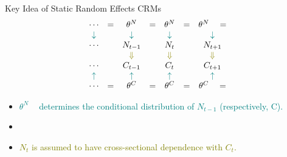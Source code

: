 \documentclass[ignorenonframetext,]{beamer}
\begin{document}
\begin{frame}{Key Idea of Static Random Effects CRMs}
$$
\begin{array}{ccccccc}
\cdots & = & \theta^N & = & \theta^N & = & \theta^N \quad = \\
\textcolor{teal}{\downarrow} & & \textcolor{teal}{\downarrow} & & \textcolor{teal}{\downarrow} & & \textcolor{teal}{\downarrow} \\
\cdots & & N_{t-1} & & N_t & & N_{t+1} \\
 & & \textcolor{olive}{\Downarrow} & & \textcolor{olive}{\Downarrow} & & \textcolor{olive}{\Downarrow} \\
\cdots & & C_{t-1} & & C_t & & C_{t+1} \\
\textcolor{teal}{\uparrow} & & \textcolor{teal}{\uparrow} & & \textcolor{teal}{\uparrow} & & \textcolor{teal}{\uparrow} \\
\cdots & = & \theta^C & = & \theta^C & = & \theta^C \quad =
\end{array}
$$
\pause
\begin{itemize}
\item \textcolor{teal}{$\theta^N_{\phantom{t-1}}$ determines the conditional distribution of $N_{t-1}$ (respectively, C).}
\pause
\item {}
\pause
\item \textcolor{olive}{$N_t$ is assumed to have cross-sectional dependence with $C_t$.}
\end{itemize}
\end{frame}
\end{document}
